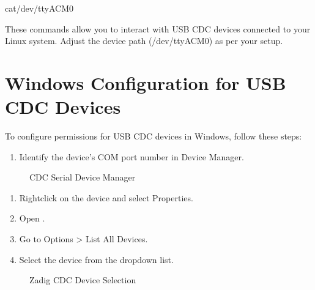 \documentclass[letterpaper,10pt,english]{sphinxmanual}
\begin{document}
\begin{sphinxVerbatim}[commandchars=\\\{\}]
cat/dev/ttyACM0
\end{sphinxVerbatim}

\sphinxAtStartPar
These commands allow you to interact with USB CDC devices connected to your Linux system. Adjust the device path (/dev/ttyACM0) as per your setup.


\section{Windows Configuration for USB CDC Devices}
\label{\detokenize{cdc:windows-configuration-for-usb-cdc-devices}}
\sphinxAtStartPar
To configure permissions for USB CDC devices in Windows, follow these steps:
\begin{enumerate}
%
\item {} 
\sphinxAtStartPar
Identify the device’s COM port number in Device Manager.

\end{enumerate}

\begin{figure}[htbp]
\centering
\capstart

\noindent{}
\caption{CDC Serial Device Manager}\label{\detokenize{cdc:id1}}\label{\detokenize{cdc:figura-device-manager}}\end{figure}
\begin{enumerate}
%
\setcounter{enumi}{1}
\item {} 
\sphinxAtStartPar
Right\sphinxhyphen{}click on the device and select Properties.

\item {} 
\sphinxAtStartPar
Open .

\item {} 
\sphinxAtStartPar
Go to Options \textgreater{} List All Devices.

\item {} 
\sphinxAtStartPar
Select the device from the drop\sphinxhyphen{}down list.

\end{enumerate}

\begin{figure}[htbp]
\centering
\capstart

\noindent{}
\caption{Zadig CDC Device Selection}\label{\detokenize{cdc:id2}}\label{\detokenize{cdc:figura-zadig}}\end{figure}
\end{document}
